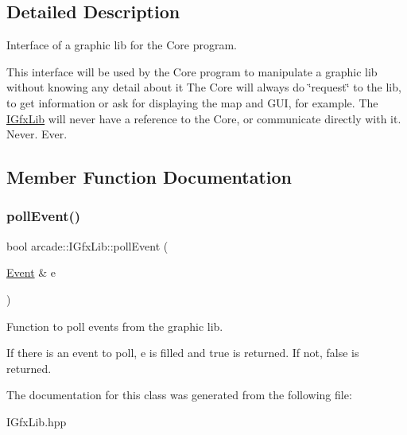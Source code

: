 \subsection{Detailed Description}
Interface of a graphic lib for the Core program. 

This interface will be used by the Core program to manipulate a graphic lib without knowing any detail about it The Core will always do \char`\"{}request\char`\"{} to the lib, to get information or ask for displaying the map and G\+UI, for example. The \hyperlink{classarcade_1_1IGfxLib}{I\+Gfx\+Lib} will never have a reference to the Core, or communicate directly with it. Never. Ever. 

\subsection{Member Function Documentation}
\mbox{\label{classarcade_1_1IGfxLib_a82cdd82f168ca898ef81edf82ca6147a}} 
\subsubsection{\texorpdfstring{poll\+Event()}{pollEvent()}}
{\footnotesize\ttfamily bool arcade\+::\+I\+Gfx\+Lib\+::poll\+Event (\begin{DoxyParamCaption}\item[{\hyperlink{structarcade_1_1Event}{Event} \&}]{e }\end{DoxyParamCaption})\hspace{0.3cm}{\ttfamily [pure virtual]}}



Function to poll events from the graphic lib. 

If there is an event to poll, e is filled and true is returned. If not, false is returned. 

The documentation for this class was generated from the following file\+:\begin{DoxyCompactItemize}
\item 
I\+Gfx\+Lib.\+hpp\end{DoxyCompactItemize}
